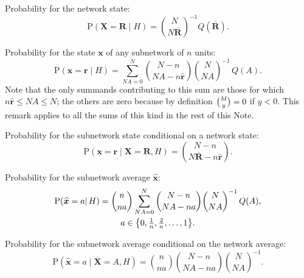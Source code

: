 \documentclass{article}
\theoremstyle{innote}
\newcommand*{\av}{\overline} %
\newcommand*{\sav}{\widehat} %
\newcommand*{\yx}{\bm{x}}%
\newcommand*{\yxs}{\sav{\yx}}%
\newcommand*{\yX}{\bm{X}}%
\newcommand*{\yXf}{\av{\yX}}%
\newcommand*{\yr}{\bm{r}}%
\newcommand*{\yrs}{\sav{\yr}}%
\newcommand*{\yR}{\bm{R}}%
\newcommand*{\yRf}{\av{\yR}}%
\newcommand*{\yH}{\varEta}
\DeclarePairedDelimiter\set{\{}{\}}
\newcommand*{\cond}%
{\mathpunct{|}}%
\renewcommand{\le}{\leqslant}%
\newcommand*{\p}{\mathrm{P}}%
\renewcommand*{\|}{\cond}
\newcommand*{\+}{\lor}
\let\varEta H
\begin{document}
\begin{asparaenum}
  \medskip\item\label{item:tot_plaus}Probability for the network state:
\begin{equation}
  \label{eq:joint_plaus_N_homog}
  \p(\yX = \yR \cond H) = \binom{N}{N\yRf}^{-1} Q(\yRf).
\end{equation}

\medskip
\item\label{item:marginal}Probability for the state $\yx$ of any subnetwork
  of $n$ units:
\begin{equation}
  \label{eq:marginal}
    \p(\yx = \yr \cond \yH) =
\sum_{N A =0}^{N}
\binom{N-n}{N A-n\yrs}\binom{N}{N A}^{-1}\,
Q(A).
\end{equation}
Note that the only summands contributing to this sum are those for which
$n\yrs \le NA \le N$; the others are zero because by definition
$\tbinom{M}{y}=0$ if $y<0$. This remark applies to all the sums of this
kind in the rest of this Note.

\medskip
\item\label{item:conditional}Probability for the subnetwork
  state conditional on a network state:
\begin{equation}
  \label{eq:conditional_total_state}
  \p(\yx = \yr \cond \yX = \yR, \yH)
=
\binom{N-n}{N \yRf-n \yrs}.
\end{equation}

\medskip
\item\label{item:marginal_average}Probability for the
  subnetwork average $\yxs$:
\begin{multline}
  \label{eq:subpop_average}
  \p(\yxs = a  \cond \yH) = \binom{n}{n a}
 \sum_{N A=0}^{N}
\binom{N-n}{N A-n a}\binom{N}{N A}^{-1}\,
Q(A),
\\
a \in \set*{0,\tfrac{1}{n},\tfrac{2}{n},\dotsc,1}.
\end{multline}

\medskip
\item\label{item:conditional_average}Probability for the subnetwork
  average conditional on the network average:
\begin{equation}
  \label{eq:conditional_prob}
  \p(\yxs = a \cond \yXf = A, \yH)
=
\binom{n}{n a}\binom{N-n}{N A-n a}\binom{N}{N A}^{-1}.
\end{equation}


\end{asparaenum}
\end{document}
